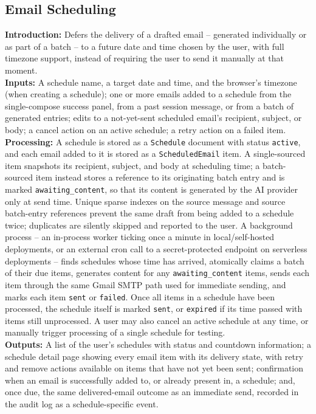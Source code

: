 \documentclass[12pt,a4paper]{article}
\begin{document}
\subsection{Email Scheduling}
\noindent\textbf{Introduction:} Defers the delivery of a drafted email -- generated individually or as part of a batch -- to a future date and time chosen by the user, with full timezone support, instead of requiring the user to send it manually at that moment.\\
\noindent\textbf{Inputs:} A schedule name, a target date and time, and the browser's timezone (when creating a schedule); one or more emails added to a schedule from the single-compose success panel, from a past session message, or from a batch of generated entries; edits to a not-yet-sent scheduled email's recipient, subject, or body; a cancel action on an active schedule; a retry action on a failed item.\\
\noindent\textbf{Processing:} A schedule is stored as a \texttt{Schedule} document with status \texttt{active}, and each email added to it is stored as a \texttt{ScheduledEmail} item. A single-sourced item snapshots its recipient, subject, and body at scheduling time; a batch-sourced item instead stores a reference to its originating batch entry and is marked \texttt{awaiting\_content}, so that its content is generated by the AI provider only at send time. Unique sparse indexes on the source message and source batch-entry references prevent the same draft from being added to a schedule twice; duplicates are silently skipped and reported to the user. A background process -- an in-process worker ticking once a minute in local/self-hosted deployments, or an external cron call to a secret-protected endpoint on serverless deployments -- finds schedules whose time has arrived, atomically claims a batch of their due items, generates content for any \texttt{awaiting\_content} items, sends each item through the same Gmail SMTP path used for immediate sending, and marks each item \texttt{sent} or \texttt{failed}. Once all items in a schedule have been processed, the schedule itself is marked \texttt{sent}, or \texttt{expired} if its time passed with items still unprocessed. A user may also cancel an active schedule at any time, or manually trigger processing of a single schedule for testing.\\
\noindent\textbf{Outputs:} A list of the user's schedules with status and countdown information; a schedule detail page showing every email item with its delivery state, with retry and remove actions available on items that have not yet been sent; confirmation when an email is successfully added to, or already present in, a schedule; and, once due, the same delivered-email outcome as an immediate send, recorded in the audit log as a schedule-specific event.
\end{document}
